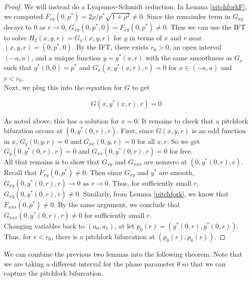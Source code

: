 \documentclass[thesis.tex]{subfiles}
\begin{document}
\begin{lemma}
\begin{proof}
We will instead do a Lyapunov-Schmidt reduction. In Lemma \ref{pitchforkF}, we computed $F_{xy}(0, p^*) = 2 \rho/p^* \sqrt{1 + \rho^2} \neq 0$. Since the remainder term in $G_{xy}$ decays to 0 as $r \rightarrow 0$, $G_{xy}(0, p^*, 0) = F_{xy}(0, p^*) \neq 0$. Thus we can use the IFT to solve $H_2(x,y,r) = G_x(x,y,r)$ for $y$ in terms of $x$ and $r$ near $(x,y,r) = (0, p^*, 0)$. By the IFT, there exists $r_0 > 0$, an open interval $(-a, a)$, and a unique function $y = y^*(x, r)$ with the same smoothness as $G_x$ such that $y^*(0, 0) = p^*$ and $G_x(x, y^*(x, r), r) = 0$ for $x \in (-a, a)$ and $r < r_0$.\\

Next, we plug this into the equation for $G$ to get

\begin{equation}
G(x, y^*(x, r), r) = 0
\end{equation}

As noted above, this has a solution for $x = 0$. It remains to check that a pitchfork bifuration occurs at $(0, y^*(0, r), r)$. First, since $G(x, y, r)$ is an odd function in $x$, $G_y(0, y, r) = 0$ and $G_{xx}(0, y, r) = 0$ for all $x, r$. So we get $G_y(0, y^*(0, r), r) = 0$ and $G_{xx}(0, y^*(0, r), r) = 0$ for free.\\

All that remains is to show that $G_{xy}$ and $G_{xxx}$ are nonzero at $(0, y^*(0, r), r)$. Recall that $F_{xy}(0, p^*) \neq 0$. Then since $G_{xy}$ and $y^*$ are smooth, $G_{xy}(0, y^*(0, r), r) \rightarrow 0 \text{ as } r \rightarrow 0$. Thus, for sufficiently small $r$, $G_{xy}(0, y^*(0, r), r) \neq 0$. Similarly, from Lemma \ref{pitchfork}, we know that $F_{xxx}(0, p^*) \neq 0$. By the same argument, we conclude that $G_{xxx}(0, y^*(0, r), r) \neq 0$ for sufficiently small $r$.\\

Changing variables back to $(a_0, a_1)$, at let $p_0(r) = (y^*(0, r), y^*(0, r))$. Thus, for $r < r_0$, there is a pitchfork bifurcation at $(p_0(r), p_0(r))$.

\end{proof}
\end{lemma}

We can combine the previous two lemmas into the following theorem. Note that we are taking a different interval for the phase parameter $\theta$ so that we can capture the pitchfork bifurcation.

\end{document}
